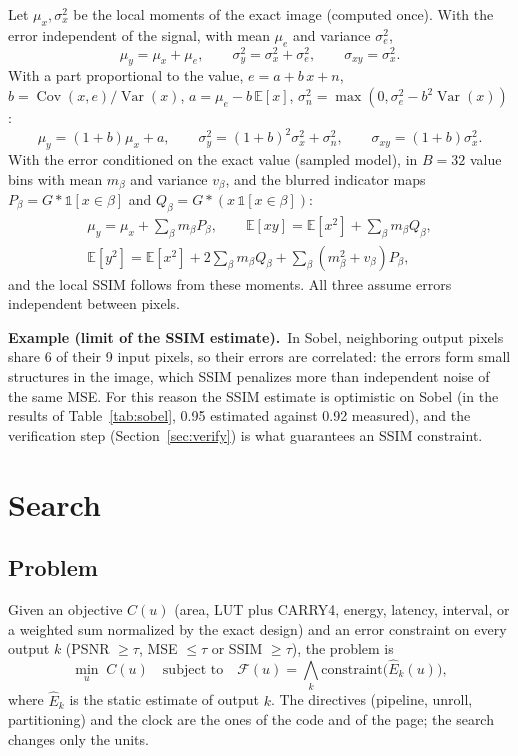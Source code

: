 \documentclass[11pt,a4paper]{article}
\newcommand{\E}{\mathbb{E}}
\newcommand{\Var}{\operatorname{Var}}
\newcommand{\Cost}{C}
\newcommand{\Feas}{\mathcal{F}}
\newcommand{\examplebox}[2]{\par\medskip\noindent\colorbox{tabAzul!6}{\begin{minipage}{\dimexpr\linewidth-2\fboxsep}
  \textbf{Example (#1).}\ #2\end{minipage}}\par\medskip}
\begin{document}
Let $\mu_x, \sigma_x^2$ be the local moments of the exact image (computed once). With the error independent of the signal,
with mean $\mu_e$ and variance $\sigma_e^2$,
\[
  \mu_y = \mu_x + \mu_e, \qquad \sigma_y^2 = \sigma_x^2 + \sigma_e^2, \qquad \sigma_{xy} = \sigma_x^2 .
\]
With a part proportional to the value, $e = a + b\,x + n$, $b = \operatorname{Cov}(x, e)/\Var(x)$,
$a = \mu_e - b\,\E[x]$, $\sigma_n^2 = \max(0, \sigma_e^2 - b^2 \Var(x))$:
\[
  \mu_y = (1+b)\mu_x + a, \qquad \sigma_y^2 = (1+b)^2\sigma_x^2 + \sigma_n^2, \qquad \sigma_{xy} = (1+b)\sigma_x^2 .
\]
With the error conditioned on the exact value (sampled model), in $B = 32$ value bins with mean $m_\beta$ and variance
$v_\beta$, and the blurred indicator maps $P_\beta = G * \mathbb{1}[x \in \beta]$ and $Q_\beta = G * (x\,\mathbb{1}[x \in \beta])$:
\begin{gather*}
  \mu_y = \mu_x + \sum_\beta m_\beta P_\beta, \qquad
  \E[xy] = \E[x^2] + \sum_\beta m_\beta Q_\beta, \\
  \E[y^2] = \E[x^2] + 2\sum_\beta m_\beta Q_\beta + \sum_\beta (m_\beta^2 + v_\beta) P_\beta,
\end{gather*}
and the local SSIM follows from these moments. All three assume errors independent between pixels.

\examplebox{limit of the SSIM estimate}{In Sobel, neighboring output pixels share 6 of their 9 input pixels, so their
errors are correlated: the errors form small structures in the image, which SSIM penalizes more than independent
noise of the same MSE. For this reason the SSIM estimate is optimistic on Sobel (in the results of
Table~\ref{tab:sobel}, 0.95 estimated against 0.92 measured), and the verification step (Section~\ref{sec:verify}) is
what guarantees an SSIM constraint.}

\section{Search}\label{sec:search}

\subsection{Problem}

Given an objective $\Cost(u)$ (area, LUT plus CARRY4, energy, latency, interval, or a weighted sum normalized by the
exact design) and an error constraint on every output $k$ (PSNR $\ge \tau$, MSE $\le \tau$ or SSIM $\ge \tau$), the
problem is
\[
  \min_{u} \; \Cost(u) \quad \text{subject to} \quad \Feas(u) = \bigwedge_k \text{constraint}\big(\hat E_k(u)\big),
\]
where $\hat E_k$ is the static estimate of output $k$. The directives (pipeline, unroll, partitioning) and the clock
are the ones of the code and of the page; the search changes only the units.
\end{document}
